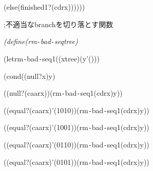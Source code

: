 \documentclass{article}
\begin{document}
\noindent
\mbox{}{\sl {}\charwd}{\sl {}\charwd}(else{\sl {}\charwd}(finished1?{\sl {}\charwd}(cdr{\sl {}\charwd}x))))))

\noindent
\mbox{}\hfill

\noindent
\mbox{}\rm\mc \rm\mc %

\noindent
\mbox{};\charwd 不適当な\charwd branch\charwd を切り落とす関数

\noindent
\mbox{}\sl (define{\sl {}\charwd}(rm{\tt -}bad{\tt -}seq{\sl {}\charwd}tree)

\noindent
\mbox{}{\sl {}\charwd}(let{\sl {}\charwd}rm{\tt -}bad{\tt -}seq1{\sl {}\charwd}((x{\sl {}\charwd}tree){\sl {}\charwd}(y{\sl {}\charwd}'()))

\noindent
\mbox{}{\sl {}\charwd}(cond{\sl {}\charwd}((null?{\sl {}\charwd}x){\sl {}\charwd}y)

\noindent
\mbox{}{\sl {}\charwd}{\sl {}\charwd}((null?{\sl {}\charwd}(caar{\sl {}\charwd}x)){\sl {}\charwd}(rm{\tt -}bad{\tt -}seq1{\sl {}\charwd}(cdr{\sl {}\charwd}x){\sl {}\charwd}y))

\noindent
\mbox{}{\sl {}\charwd}{\sl {}\charwd}((equal?{\sl {}\charwd}(caar{\sl {}\charwd}x){\sl {}\charwd}'(1{\sl {}\charwd}0{\sl {}\charwd}1{\sl {}\charwd}0)){\sl {}\charwd}(rm{\tt -}bad{\tt -}seq1{\sl {}\charwd}(cdr{\sl {}\charwd}x){\sl {}\charwd}y))

\noindent
\mbox{}{\sl {}\charwd}{\sl {}\charwd}((equal?{\sl {}\charwd}(caar{\sl {}\charwd}x){\sl {}\charwd}'(1{\sl {}\charwd}0{\sl {}\charwd}0{\sl {}\charwd}1)){\sl {}\charwd}(rm{\tt -}bad{\tt -}seq1{\sl {}\charwd}(cdr{\sl {}\charwd}x){\sl {}\charwd}y))

\noindent
\mbox{}{\sl {}\charwd}{\sl {}\charwd}((equal?{\sl {}\charwd}(caar{\sl {}\charwd}x){\sl {}\charwd}'(0{\sl {}\charwd}1{\sl {}\charwd}1{\sl {}\charwd}0)){\sl {}\charwd}(rm{\tt -}bad{\tt -}seq1{\sl {}\charwd}(cdr{\sl {}\charwd}x){\sl {}\charwd}y))

\noindent
\mbox{}{\sl {}\charwd}{\sl {}\charwd}((equal?{\sl {}\charwd}(caar{\sl {}\charwd}x){\sl {}\charwd}'(0{\sl {}\charwd}1{\sl {}\charwd}0{\sl {}\charwd}1)){\sl {}\charwd}(rm{\tt -}bad{\tt -}seq1{\sl {}\charwd}(cdr{\sl {}\charwd}x){\sl {}\charwd}y))
\end{document}
